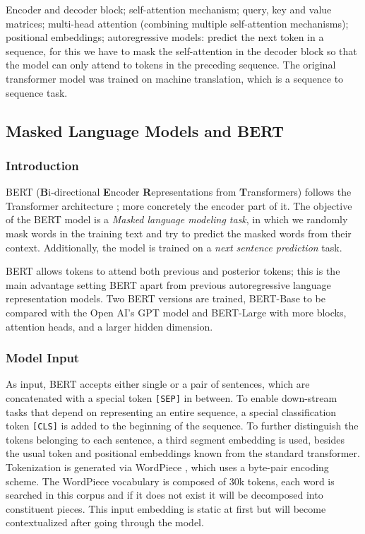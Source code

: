 \documentclass[11pt, a4paper]{amsart}
\begin{document}
{
	\color{blue}
	
	Encoder and decoder block; self-attention mechanism; query, key and value matrices; multi-head attention (combining multiple self-attention mechanisms); positional embeddings; autoregressive models: predict the next token in a sequence, for this we have to mask the self-attention in the decoder block so that the model can only attend to tokens in the preceding sequence.
	The original transformer model was trained on machine translation, which is a sequence to sequence task.
} %


\subsection{Masked Language Models and BERT}

\subsubsection{Introduction}

BERT (\textbf{B}i-directional \textbf{E}ncoder \textbf{R}epresentations from \textbf{T}ransformers) follows the Transformer architecture \cite{DBLP:journals/corr/VaswaniSPUJGKP17}; more concretely the encoder part of it. 
The objective of the BERT model is a \emph{Masked language modeling task}, in which we randomly mask words in the training text and try to predict the masked words from their context.
Additionally, the model is trained on a \emph{next sentence prediction} task.

BERT allows tokens to attend both previous and posterior tokens; this is the main advantage setting BERT apart from previous autoregressive language representation models. 
Two BERT versions are trained, BERT-Base to be compared with the Open AI's GPT model and BERT-Large with more blocks, attention heads, and a larger hidden dimension.

\subsubsection{Model Input}

As input, BERT accepts either single or a pair of sentences, which are concatenated with a special token \texttt{[SEP]} in between.
To enable down-stream tasks that depend on representing an entire sequence, a special classification token \texttt{[CLS]} is added to the beginning of the sequence.
To further distinguish the tokens belonging to each sentence, a third segment embedding is used, besides the usual token and positional embeddings known from the standard transformer. 
Tokenization is generated via WordPiece \cite{wu2016google}, which uses a byte-pair encoding scheme. 
The WordPiece vocabulary is composed of 30k tokens, each word is searched in this corpus and if it does not exist it will be decomposed into constituent pieces. 
This input embedding is static at first but will become contextualized after going through the model.
\end{document}
